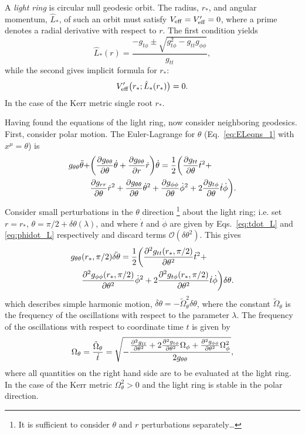 A \emph{light ring} is circular null geodesic orbit. 
The radius, $r_*$, and angular momentum, $\hat{L}_*$, of such an orbit must satisfy $V_{\rm eff} = V'_{\rm eff} = 0$, where a prime denotes a radial derivative with respect to $r$. The first condition yields
\begin{equation}
	\hat{L}_*(r) = \frac{-g_{t \phi} \pm \sqrt{g_{t \phi}^2 - g_{t t}g_{\phi \phi}}}{g_{t t}},
\end{equation}
while the second gives implicit formula for $r_*$:
\begin{gather}
	V'_{\rm eff}\big(r_*;\hat{L}_*(r_*)\big) = 0.
\end{gather}
In the case of the Kerr metric single root $r_*$.

Having found the equations of the light ring, now consider neighboring geodesics. 
First, consider polar motion. The Euler-Lagrange for $\theta$ (Eq.~\ref{eq:ELeqns_1} with $x^\mu=\theta$) is 
\begin{align}\label{eq:el_theta}
	g_{\theta \theta} \ddot{\theta} + & \qty(\pdv{g_{\theta \theta}}{\theta} \dot{\theta} + \pdv{g_{\theta \theta}}{r} \dot{r}) \dot{\theta}
	= \frac{1}{2} \bigg(\pdv{g_{t t}}{\theta} \dot{t}^2 + \nonumber \\ &\pdv{g_{r r}}{\theta} \dot{r}^2 + \pdv{g_{\theta \theta}}{\theta} \dot{\theta}^2 + \pdv{g_{\phi \phi}}{\theta} \dot{\phi}^2 + 2\pdv{g_{t \phi}}{\theta} \dot{t}\dot{\phi}\bigg).
\end{align}
Consider small perturbations in the $\theta$ direction \footnote{It is sufficient to consider $\theta$ and $r$ perturbations separately\ldots} about the light ring; i.e. set $r = r_*$, $\theta = \pi/2+\delta\theta(\lambda)$, and where $\dot{t}$ and $\dot{\phi}$ are given by Eqs.~\ref{eq:tdot_L} and \ref{eq:phidot_L} respectively and discard terms $\mathcal{O}(\delta\theta^2)$. 
This gives
\begin{align}\label{eq:el_theta_expanded}
	g_{\theta \theta}&(r_*,\pi/2) \ddot{\delta \theta} = \frac{1}{2} \bigg(\pdv[2]{g_{t t}(r_*,\pi/2)}{\theta} \dot{t}^2  
	+ \nonumber\\ & \pdv[2]{g_{\phi\phi}(r_*,\pi/2)}{\theta} \dot{\phi}^2 
	+2\pdv[2]{g_{t \phi}(r_*,\pi/2)}{\theta} \dot{t}\dot{\phi}\bigg)\delta \theta.
\end{align}
which describes simple harmonic motion, $\ddot{\delta\theta}=-\tilde{\Omega}^2_\theta\delta\theta$, where the constant $\tilde{\Omega}_\theta$ is the frequency of the oscillations with respect to the parameter $\lambda$.
The frequency of the oscillations with respect to coordinate time $t$ is given by
\begin{align}
	\Omega_\theta = \frac{\tilde{\Omega}_\theta}{\dot{t}} =\sqrt{-\frac{
			\pdv[2]{g_{t t}}{\theta} +2\pdv[2]{g_{t \phi}}{\theta} \Omega_\phi + \pdv[2]{g_{\phi\phi}}{\theta} \Omega_\phi^2
		}{2g_{\theta \theta}}} ,
\end{align}
where all quantities on the right hand side are to be evaluated at the light ring. 
In the case of the Kerr metric $\Omega_\theta^2>0$ and the light ring is stable in the polar direction.

